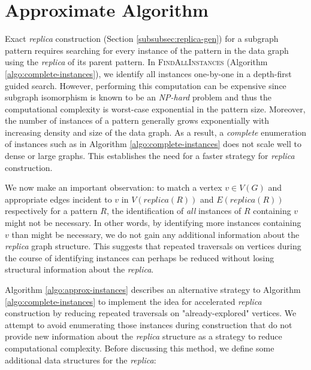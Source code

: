 \section{Approximate Algorithm}
\label{sec:approx_algo}
Exact \textit{replica} construction (Section \ref{subsubsec:replica-gen}) for a
subgraph pattern requires searching for every instance of the pattern in the
data graph using the \textit{replica} of its parent pattern. In
\textsc{FindAllInstances} (Algorithm \ref{algo:complete-instances}), we identify
all instances one-by-one in a depth-first guided search. However, performing
this computation can be expensive since subgraph isomorphism is known to be an
\textit{NP-hard} problem and thus the computational complexity is worst-case
exponential in the pattern size. Moreover, the number of instances of a pattern
generally grows exponentially with increasing density and size of the data
graph. As a result, a \emph{complete} enumeration of instances such as in
Algorithm \ref{algo:complete-instances} does not scale well to dense or large
graphs. This establishes the need for a faster strategy for \textit{replica}
construction.

We now make an important observation: to match a vertex $v\in V(G)$ and
appropriate edges incident to $v$ in $V(replica(R))$  and $E(replica(R))$
respectively for a pattern $R$, the identification of \textit{all} instances of
$R$ containing $v$ might not be necessary. In other words, by identifying more
instances containing $v$ than might be necessary, we do not gain any additional
information about the \textit{replica} graph structure. This suggests that
repeated traversals on vertices during the course of identifying instances can
perhaps be reduced without losing structural information about the
\textit{replica}.

Algorithm \ref{algo:approx-instances} describes an alternative strategy to
Algorithm \ref{algo:complete-instances} to implement the idea for accelerated
\textit{replica} construction by reducing repeated traversals on
"already-explored" vertices. We attempt to avoid enumerating those instances
during construction that do not provide new information about the \emph{replica}
structure as a strategy to reduce computational complexity. Before discussing
this method, we define some additional data structures for the \textit{replica}:

